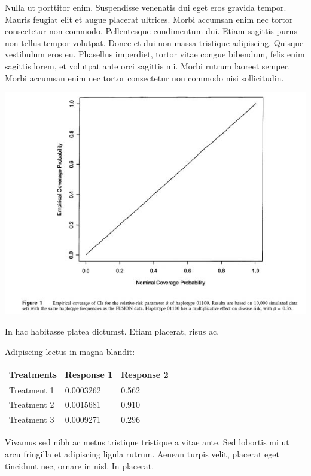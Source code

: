 \documentclass[a1,portrait]{a1poster}
\begin{document}
\begin{multicols}{2}
Nulla ut porttitor enim. Suspendisse venenatis dui eget eros gravida tempor. Mauris feugiat elit et augue placerat ultrices. Morbi accumsan enim nec tortor consectetur non commodo. Pellentesque condimentum dui. Etiam sagittis purus non tellus tempor volutpat. Donec et dui non massa tristique adipiscing. Quisque vestibulum eros eu. Phasellus imperdiet, tortor vitae congue bibendum, felis enim sagittis lorem, et volutpat ante orci sagittis mi. Morbi rutrum laoreet semper. Morbi accumsan enim nec tortor consectetur non commodo nisi sollicitudin.

\begin{center}\vspace{1cm}
\includegraphics[width=0.5\linewidth]{epstein_fig1}
\end{center}\vspace{1cm}

In hac habitasse platea dictumst. Etiam placerat, risus ac.

Adipiscing lectus in magna blandit:

\begin{center}\vspace{1cm}
\begin{tabular}{l l l l}
\toprule
\textbf{Treatments} & \textbf{Response 1} & \textbf{Response 2} \\
\midrule
Treatment 1 & 0.0003262 & 0.562 \\
Treatment 2 & 0.0015681 & 0.910 \\
Treatment 3 & 0.0009271 & 0.296 \\
\bottomrule
\end{tabular}
\end{center}\vspace{1cm}

Vivamus sed nibh ac metus tristique tristique a vitae ante. Sed lobortis mi ut arcu fringilla et adipiscing ligula rutrum. Aenean turpis velit, placerat eget tincidunt nec, ornare in nisl. In placerat.


\end{multicols}
\end{document}
